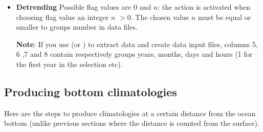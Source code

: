 \begin{itemize}
\begin{itemize}
\item[*] : contains the color palette for the same variable.
\item[*] : contains the box for plotting. This is typically used to plot only the region of interest, without overlapping regions with other climatologies (the numerical fields include the overlapping regions, only the plotting is limited with the  file).
\end{itemize}
{\bf Note}: the gnuplot colorbars use a scale that is actually remapped to the bounds found in . Example:
if your colorbar definition goes from 0 to 10 and the {\tt VAR} bounds are from 0 and 100, a value of 50 in the variable analysed will use the color found in the colorbar definition at value 5. To help you designing a specially adapted color bar lets say for salinity, it is therefore a good idea to define the colorbar with the same bounds as those in .

{\bf Note}: for adapting the color palette, file  contains a list of pre-existing colors and their hexadecimal codes you can use instead of names.

\item {\bf Detrending} Possible flag values are $0$ and $n$: the action is activated when choosing flag value an integer $n$ $>0$. The chosen value $n$ must be equal or smaller to groups number in data files.\par
{\bf Note}: If you use  (or ) to extract data and create data input files, columns 5, 6 ,7 and 8 contain respectively groups years, months, days and hours (1 for the first year in the selection etc).
\end{itemize}

\subsection{Producing bottom climatologies}

Here are the steps to produce climatologies at a certain distance from the ocean bottom (unlike previous sections where the distance is counted from the surface).

